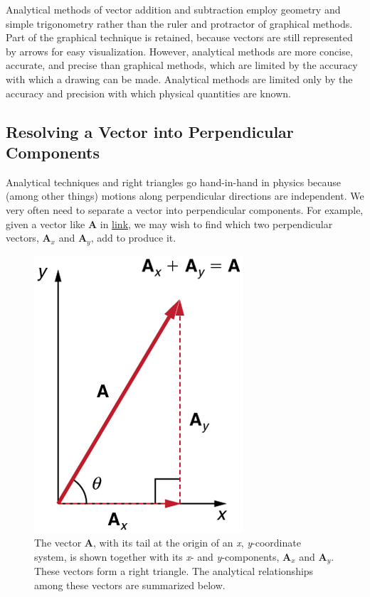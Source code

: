 \documentclass[
]{book}
\begin{document}
\protect\hypertarget{import-auto-id1165298770648}{}{Analytical methods} of
vector addition and subtraction employ geometry and simple trigonometry
rather than the ruler and protractor of graphical methods. Part of the
graphical technique is retained, because vectors are still represented
by arrows for easy visualization. However, analytical methods are more
concise, accurate, and precise than graphical methods, which are limited
by the accuracy with which a drawing can be made. Analytical methods are
limited only by the accuracy and precision with which physical
quantities are known.

\hypertarget{fs-id1472855}{}
\hypertarget{resolving-a-vector-into-perpendicular-components}{%
\subsection{Resolving a Vector into Perpendicular Components}\label{resolving-a-vector-into-perpendicular-components}}

Analytical techniques and right triangles go hand-in-hand in physics
because (among other things) motions along perpendicular directions are
independent. We very often need to separate a vector into perpendicular
components. For example, given a vector like \(\mathbf{A}{}\) in
\protect\hyperlink{import-auto-id1165298677803}{link}, we may
wish to find which two perpendicular vectors, \(\mathbf{A}_{x}{}\) and
\(\mathbf{A}_{y}{}\), add to produce it.

\begin{figure}
\hypertarget{import-auto-id1165298677803}{%
\centering
\includegraphics{images/Figure_03_03_01a.jpg}
\caption{The vector \(\mathbf{A}{}\), with its tail at the origin of an \emph{x},
\emph{y}-coordinate system, is shown together with its \emph{x}- and
\emph{y}-components, \(\mathbf{A}_{x}{}\) and \(\mathbf{A}_{y}{}\). These vectors
form a right triangle. The analytical relationships among these vectors
are summarized
below.}\label{import-auto-id1165298677803}
}
\end{figure}
\end{document}
